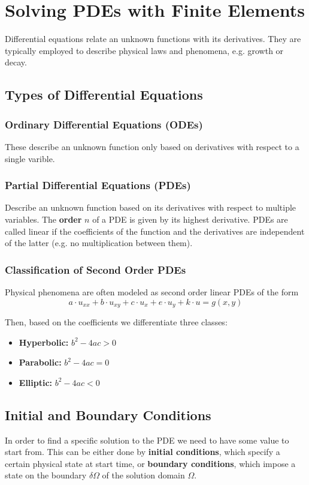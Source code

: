 \documentclass{article}
\begin{document}
\section{Solving PDEs with Finite Elements}
Differential equations relate an unknown functions with its derivatives.
They are typically employed to describe physical laws and phenomena, e.g. growth or decay.

\subsection{Types of Differential Equations}
\subsubsection{Ordinary Differential Equations (ODEs)}
These describe an unknown function only based on derivatives with respect to a single varible.

\subsubsection{Partial Differential Equations (PDEs)}
Describe an unknown function based on its derivatives with respect to multiple variables.
The \textbf{order} $n$ of a PDE is given by its highest derivative.
PDEs are called linear if the coefficients of the function and the derivatives are independent of the latter (e.g. no multiplication between them).

\subsubsection{Classification of Second Order PDEs}
Physical phenomena are often modeled as second order linear PDEs of the form
\begin{equation}
    a \cdot u_{xx} + b \cdot u_{xy} + c \cdot u_{x} + e \cdot u_{y} + k \cdot u = g(x,y)
\end{equation}

Then, based on the coefficients we differentiate three classes:
\begin{itemize}
    \item \textbf{Hyperbolic:} $b^2 - 4ac > 0$
    \item \textbf{Parabolic:} $b^2 - 4ac = 0$
    \item \textbf{Elliptic:} $b^2 - 4ac < 0$
\end{itemize}

\subsection{Initial and Boundary Conditions}
In order to find a specific solution to the PDE we need to have some value to start from.
This can be either done by \textbf{initial conditions}, which specify a certain physical state at start time, or \textbf{boundary conditions}, which impose a state on the boundary $\delta \Omega$ of the solution domain $\Omega$.
\end{document}
